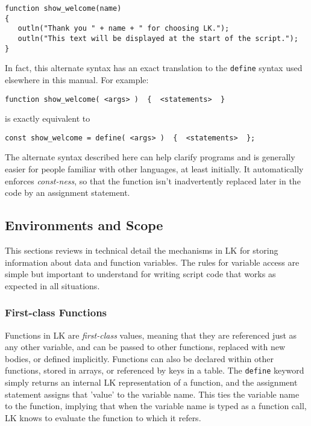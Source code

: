 \documentclass{article}
\begin{document}
\begin{verbatim}
function show_welcome(name)
{
   outln("Thank you " + name + " for choosing LK.");
   outln("This text will be displayed at the start of the script.");
}
\end{verbatim}

In fact, this alternate syntax has an exact translation to the \texttt{define} syntax used elsewhere in this manual.  For example:

\begin{verbatim}
function show_welcome( <args> )  {  <statements>  }
\end{verbatim}
is exactly equivalent to
\begin{verbatim}
const show_welcome = define( <args> )  {  <statements>  };
\end{verbatim}

The alternate syntax described here can help clarify programs and is generally easier for people familiar with other languages, at least initially.  It automatically enforces \emph{const-ness}, so that the function isn't inadvertently replaced later in the code by an assignment statement.

\subsection{Environments and Scope}

This sections reviews in technical detail the mechanisms in LK for storing information about data and function variables.  The rules for variable access are simple but important to understand for writing script code that works as expected in all situations.

\subsubsection{First-class Functions}

Functions in LK are \emph{first-class} values, meaning that they are referenced just as any other variable, and can be passed to other functions, replaced with new bodies, or defined implicitly.  Functions can also be declared within other functions, stored in arrays, or referenced by keys in a table.  The \texttt{define} keyword simply returns an internal LK representation of a function, and the assignment statement assigns that 'value' to the variable name.  This ties the variable name to the function, implying that when the variable name is typed as a function call, LK knows to evaluate the function to which it refers.
\end{document}
